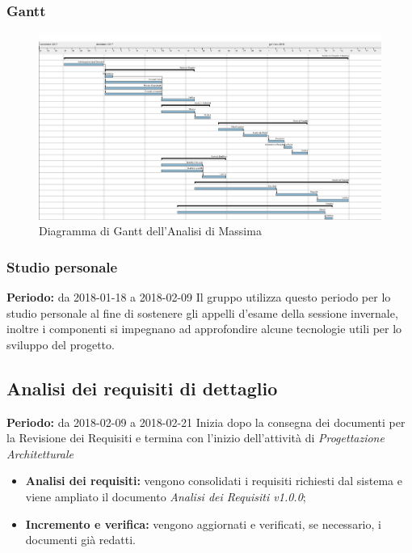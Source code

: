 \subsubsection{Gantt}
\begin{figure}[H]
	\centering 
	\includegraphics[width=1\textwidth]{images/Analisi-di-Massima.png}
	\caption{Diagramma di Gantt dell'Analisi di Massima}
	\label{graficobello} 
\end{figure}
\subsubsection{Studio personale}
\textbf{Periodo:} da 2018-01-18 a 2018-02-09 \Spazio
Il gruppo utilizza questo periodo per lo studio personale al fine di sostenere gli appelli d'esame della sessione invernale, inoltre i componenti si impegnano ad approfondire alcune tecnologie utili per lo sviluppo del progetto.
\subsection{Analisi dei requisiti di dettaglio}
    \textbf{Periodo:} da 2018-02-09 a 2018-02-21 \Spazio
    Inizia dopo la consegna dei documenti per la Revisione dei Requisiti e termina con l'inizio dell'attività di \emph{Progettazione Architetturale}
    \begin{itemize}
    	\item \textbf{Analisi dei requisiti:} vengono consolidati i requisiti richiesti dal sistema e viene ampliato il documento \emph{Analisi dei Requisiti v1.0.0};
    	\item \textbf{Incremento e verifica:} vengono aggiornati e verificati, se necessario, i documenti già redatti. 
    \end{itemize}
